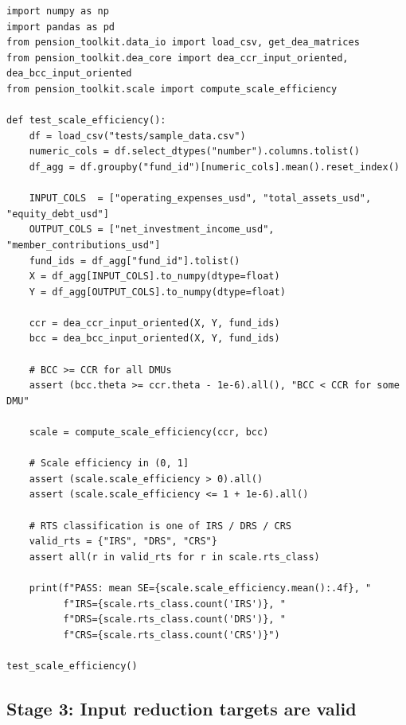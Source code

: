 \documentclass[12pt,a4paper]{article}
\begin{document}
\begin{lstlisting}[style=python, caption={Test: BCC dominance and scale efficiency bounds}]
import numpy as np
import pandas as pd
from pension_toolkit.data_io import load_csv, get_dea_matrices
from pension_toolkit.dea_core import dea_ccr_input_oriented, dea_bcc_input_oriented
from pension_toolkit.scale import compute_scale_efficiency

def test_scale_efficiency():
    df = load_csv("tests/sample_data.csv")
    numeric_cols = df.select_dtypes("number").columns.tolist()
    df_agg = df.groupby("fund_id")[numeric_cols].mean().reset_index()

    INPUT_COLS  = ["operating_expenses_usd", "total_assets_usd", "equity_debt_usd"]
    OUTPUT_COLS = ["net_investment_income_usd", "member_contributions_usd"]
    fund_ids = df_agg["fund_id"].tolist()
    X = df_agg[INPUT_COLS].to_numpy(dtype=float)
    Y = df_agg[OUTPUT_COLS].to_numpy(dtype=float)

    ccr = dea_ccr_input_oriented(X, Y, fund_ids)
    bcc = dea_bcc_input_oriented(X, Y, fund_ids)

    # BCC >= CCR for all DMUs
    assert (bcc.theta >= ccr.theta - 1e-6).all(), "BCC < CCR for some DMU"

    scale = compute_scale_efficiency(ccr, bcc)

    # Scale efficiency in (0, 1]
    assert (scale.scale_efficiency > 0).all()
    assert (scale.scale_efficiency <= 1 + 1e-6).all()

    # RTS classification is one of IRS / DRS / CRS
    valid_rts = {"IRS", "DRS", "CRS"}
    assert all(r in valid_rts for r in scale.rts_class)

    print(f"PASS: mean SE={scale.scale_efficiency.mean():.4f}, "
          f"IRS={scale.rts_class.count('IRS')}, "
          f"DRS={scale.rts_class.count('DRS')}, "
          f"CRS={scale.rts_class.count('CRS')}")

test_scale_efficiency()
\end{lstlisting}

\subsection{Stage 3: Input reduction targets are valid}
\end{document}
